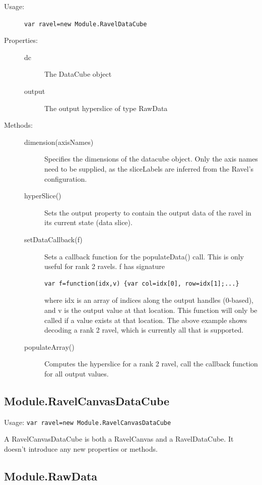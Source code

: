 \documentclass{article}
\begin{document}
\begin{description}
\item[Usage:] \verb+var ravel=new Module.RavelDataCube+
  
\item[Properties:]\mbox{}
  \begin{description}
  \item[dc] The DataCube object
  \item[output] The output hyperslice of type RawData
  \end{description}
  
\item[Methods:]\mbox{}
  \begin{description}
  \item[dimension(axisNames)]  Specifies the dimensions of the datacube
    object. Only the axis names need to be supplied, as the sliceLabels
    are inferred from the Ravel's configuration.
  \item[hyperSlice()] Sets the output property to contain the output
    data of the ravel in its current state (data slice). 
  \item[setDataCallback(f)] Sets a callback function for the
    populateData() call. This is only useful for rank 2 ravels. f has
    signature
\begin{verbatim}
var f=function(idx,v) {var col=idx[0], row=idx[1];...}
\end{verbatim}
where idx is an array of indices along the output handles (0-based),
and v is the output value at that location. This function will only be
called if a value exists at that location. The above example shows
decoding a rank 2 ravel, which is currently all that is supported.
\item[populateArray()] Computes the hyperslice for a rank 2 ravel,
call the callback function for all output values.

  \end{description}
\end{description}

\subsection{Module.RavelCanvasDataCube}

Usage: \verb+var ravel=new Module.RavelCanvasDataCube+

A RavelCanvasDataCube is both a RavelCanvas and a RavelDataCube. It
doesn't introduce any new properties or methods.

\subsection{Module.RawData}
\end{document}
